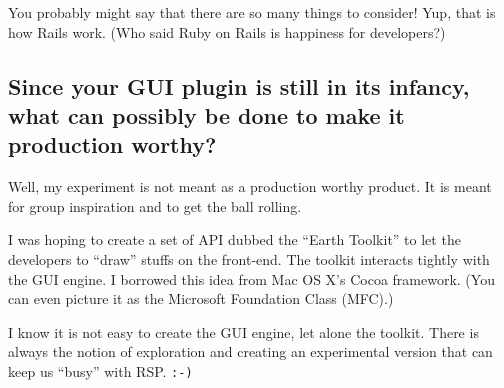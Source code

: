 \documentclass{article}
\begin{document}
You probably might say that there are so many things to consider! Yup, that is how Rails work. (Who said Ruby on Rails is happiness for developers?) 

\subsection*{Since your GUI plugin is still in its infancy, what can possibly be done to make it production worthy?}

Well, my experiment is not meant as a production worthy product. It is meant for group inspiration and to get the ball rolling. 

I was hoping to create a set of API dubbed the ``Earth Toolkit'' to let the developers to ``draw'' stuffs on the front-end. The toolkit interacts tightly with the GUI engine. I borrowed this idea from Mac OS X's Cocoa framework. (You can even picture it as the Microsoft Foundation Class (MFC).)

I know it is not easy to create the GUI engine, let alone the toolkit. There is always the notion of exploration and creating an experimental version that can keep us ``busy'' with RSP. \texttt{:-)}
\end{document}

